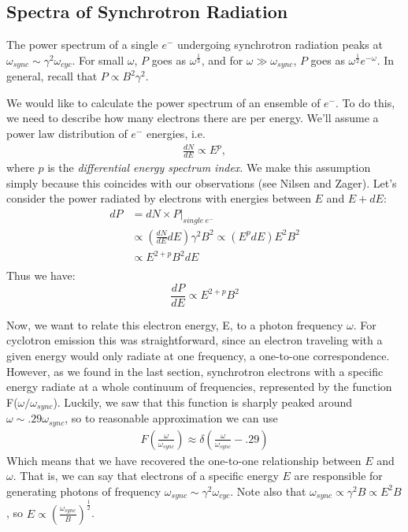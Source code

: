 \documentclass{article}
\def\hf{\frac12}
\def\eval#1{\big|_{#1}}
\def\eval#1{\big|_{#1}}
\def\hf{\frac12}
\begin{document}
\subsection{Spectra of Synchrotron Radiation}

The power spectrum of a single $e^-$ undergoing synchrotron radiation peaks at 
$\omega_{sync}\sim\gamma^2\omega_{cyc}$.  For small $\omega$, $P$ goes as
$\omega^\frac{1}{3}$, and for $\omega\gg\omega_{sync}$, $P$ goes as
$\omega^\hf e^{-\omega}$.  In general, recall that $P\propto B^2\gamma^2$.

We would like to calculate the power spectrum of an ensemble of $e^-$.  To do
this, we need to describe how many electrons there are per energy.  We'll
assume a power law distribution of $e^-$ energies, i.e.
$$\begin{aligned}\frac{dN}{ dE} \propto E^p, \end{aligned}$$ where $p$ is the {\it differential energy spectrum index}.  We make this
assumption simply because this coincides with our observations (see Nilsen and
Zager).  Let's consider the power radiated by electrons with energies between
$E$ and $E+dE$:
$$\begin{aligned}dP&=dN\times P\eval{single\ e^-}\\ 
&\propto\left(\frac{dN}{ dE}dE\right)\gamma^2B^2\propto(E^pdE)E^2B^2\\ 
&\propto E^{2+p}B^2dE\\ \end{aligned}$$
Thus we have:
$$\frac{dP}{ dE}\propto E^{2+p}B^2$$

Now, we want to relate this electron energy, E, to a photon frequency $\omega$.  For cyclotron emission this was straightforward, since an electron traveling with a given energy would only radiate at one frequency, a one-to-one correspondence.  However, as we found in the last section, synchrotron electrons with a specific energy radiate at a whole continuum of frequencies, represented by the function F($\omega/\omega_{sync}$). Luckily, we saw that this function is sharply peaked around $\omega \sim .29 \omega_{sync}$, so to reasonable approximation we can use 
$$\begin{aligned}F\left(\frac{\omega}{\omega_{sync}}\right) \approx \delta \left(\frac{\omega}{\omega_{sync}}-.29\right) \end{aligned}$$
Which means that we have recovered the one-to-one relationship between $E$ and $\omega$.
That is, we can say that electrons of a specific energy $E$ are responsible for
generating photons of frequency $\omega_{sync}\sim\gamma^2\omega_{cyc}$.  Note also
that $\omega_{sync}\propto\gamma^2B\propto E^2B$, so $E\propto\left(\frac{\omega_{sync}}{ B}
\right)^\hf$.  
\end{document}
